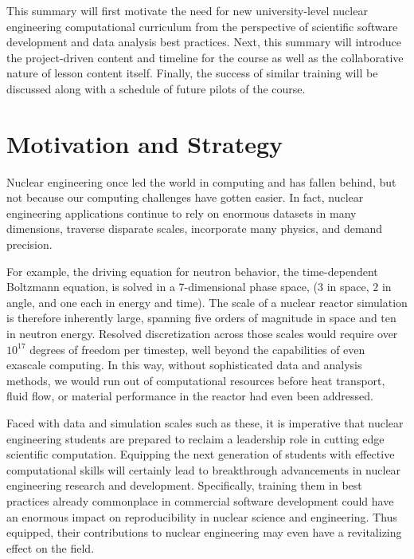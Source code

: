 \documentclass{anstrans}
\begin{document}
This summary will first motivate the need for new university-level nuclear
engineering  computational curriculum  from the perspective of  scientific
software development and data analysis best practices.  Next, this summary will
introduce the project-driven content and timeline for the course as well as the
collaborative nature of lesson content itself. Finally, the success of
similar training will be discussed along with a schedule of future pilots of
the course.

\section{Motivation and Strategy}





Nuclear engineering once led the world in computing and has fallen behind, but
not because our computing challenges have gotten easier. In fact, nuclear engineering
applications continue to rely on enormous datasets in many dimensions, traverse
disparate scales, incorporate many physics, and demand precision.

For example, the driving equation for neutron behavior, the time-dependent
Boltzmann equation, is solved in a 7-dimensional phase space, ($3$ in space, $2$
in angle, and one each in energy and time). The scale of a nuclear reactor
simulation is therefore inherently large, spanning five orders of magnitude in space and
ten in neutron energy. Resolved discretization across those scales would require
over $10^{17}$ degrees of freedom per timestep, well beyond the
capabilities of even exascale computing. In this way, without sophisticated
data and analysis methods, we would run out of computational resources before
heat transport, fluid flow, or material performance in the reactor had even
been addressed.

Faced with data and simulation scales such as these, it is imperative
that nuclear engineering students are prepared to reclaim a leadership role in
cutting edge scientific computation. Equipping the next generation of
students with effective computational skills will certainly lead to breakthrough
advancements in nuclear engineering research and development.
Specifically, training them in best practices already commonplace in commercial
software development could have an enormous impact on reproducibility in
nuclear science and engineering. Thus equipped, their contributions to nuclear
engineering may even have a revitalizing effect on the field.
\end{document}
